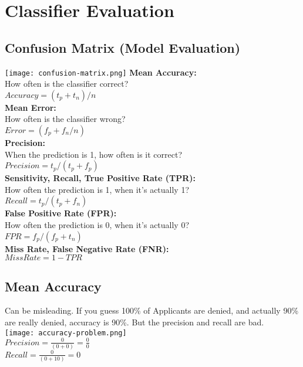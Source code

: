 \section{Classifier Evaluation}
\subsection{Confusion Matrix (Model Evaluation)}
\texttt{[image: confusion-matrix.png]}
\textbf{Mean Accuracy:}\\
How often is the classifier correct?\\
$Accuracy = (t_p + t_n) / n$\\
\textbf{Mean Error:}\\
How often is the classifier wrong?\\
$Error = (f_p + f_n / n)$\\
\textbf{Precision:}\\
When the prediction is 1, how often is it correct?\\
$Precision = t_p / (t_p + f_p)$\\
\textbf{Sensitivity, Recall, True Positive Rate (TPR):}\\
How often the prediction is 1, when it's actually 1?\\
$Recall = t_p / (t_p + f_n)$\\
\textbf{False Positive Rate (FPR):}\\
How often the prediction is 0, when it's actually 0?\\
$FPR = f_p / (f_p + t_n)$\\
\textbf{Miss Rate, False Negative Rate (FNR):}\\
$Miss Rate = 1 - TPR$

\subsection{Mean Accuracy}
Can be misleading. If you guess 100\% of Applicants are denied, and actually 90\% are really denied, accuracy is 90\%.
But the precision and recall are bad.\\
\texttt{[image: accuracy-problem.png]}\\
$Precision = \frac{0}{(0 + 0)} = \frac{0}{0}$\\
$Recall = \frac{0}{(0 + 10)} = 0$

